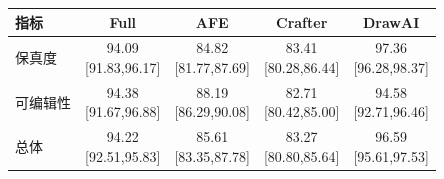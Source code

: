 \begin{tabular}{lcccc}\toprule
指标 & Full & AFE & Crafter & DrawAI \\ \midrule
保真度 & \shortstack{94.09\\{}[91.83,96.17]} & \shortstack{84.82\\{}[81.77,87.69]} & \shortstack{83.41\\{}[80.28,86.44]} & \shortstack{97.36\\{}[96.28,98.37]} \\
可编辑性 & \shortstack{94.38\\{}[91.67,96.88]} & \shortstack{88.19\\{}[86.29,90.08]} & \shortstack{82.71\\{}[80.42,85.00]} & \shortstack{94.58\\{}[92.71,96.46]} \\
总体 & \shortstack{94.22\\{}[92.51,95.83]} & \shortstack{85.61\\{}[83.35,87.78]} & \shortstack{83.27\\{}[80.80,85.64]} & \shortstack{96.59\\{}[95.61,97.53]} \\
\bottomrule\end{tabular}